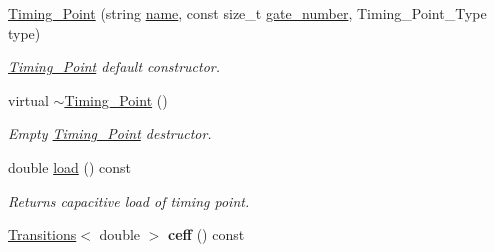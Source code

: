 \begin{DoxyCompactItemize}
\item 
\hyperlink{classTiming__Analysis_1_1Timing__Point_a05b02a7c4e302a256b20bdabf79b37d1}{Timing\-\_\-\-Point} (string \hyperlink{classTiming__Analysis_1_1Timing__Point_aa4e767553f03fb8dea972d4443edc615}{name}, const size\-\_\-t \hyperlink{classTiming__Analysis_1_1Timing__Point_a9f8c6bbc7bc46a3d1ff81a984e76126f}{gate\-\_\-number}, Timing\-\_\-\-Point\-\_\-\-Type type)
\begin{DoxyCompactList}\small\item\em \hyperlink{classTiming__Analysis_1_1Timing__Point}{Timing\-\_\-\-Point} default constructor. \end{DoxyCompactList}\item 
virtual \hyperlink{classTiming__Analysis_1_1Timing__Point_a2c676cc95977d209cfa8fe0bcb40ec49}{$\sim$\-Timing\-\_\-\-Point} ()
\begin{DoxyCompactList}\small\item\em Empty \hyperlink{classTiming__Analysis_1_1Timing__Point}{Timing\-\_\-\-Point} destructor. \end{DoxyCompactList}\item 
double \hyperlink{classTiming__Analysis_1_1Timing__Point_aaca34298e068bdcc1655c50ee914b9f4}{load} () const 
\begin{DoxyCompactList}\small\item\em Returns capacitive load of timing point. \end{DoxyCompactList}\item 
\hypertarget{classTiming__Analysis_1_1Timing__Point_aa68be5e44a1d56f3e6c98dff1efe60e5}{\hyperlink{classTransitions}{Transitions}$<$ double $>$ {\bfseries ceff} () const }\label{classTiming__Analysis_1_1Timing__Point_aa68be5e44a1d56f3e6c98dff1efe60e5}


\end{DoxyCompactItemize}
